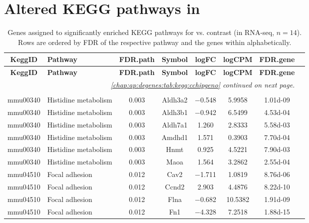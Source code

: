\section{Altered KEGG pathways in \dnmtchip}
{ \footnotesize
	\begin{longtable}[l]{cp{4.3cm}cccccc}
		\label{chap:ap:degenes:tab:kegg:cchipgeno}	
\textbf{KeggID}	& \textbf{Pathway}	& \textbf{FDR.path} & \textbf{Symbol}	 & \textbf{logFC}	& \textbf{logCPM}	& \textbf{FDR.gene}\\ 
		\hline
		\endfirsthead 
\textbf{KeggID}	& \textbf{Pathway}	& \textbf{FDR.path} & \textbf{Symbol}	& \textbf{logFC}	& \textbf{logCPM}	& \textbf{FDR.gene}\\ 
		\hline
		\endhead 
		\hline
		\multicolumn{7}{r}{\textit{	\autoref{chap:ap:degenes:tab:kegg:cchipgeno}	continued on next page.}}\\
		\endfoot
		\hline
		\multicolumn{7}{r}{\textit{}}\\
		\caption{Genes assigned to significantly enriched KEGG pathways for \dnmtchip vs. \dnmtwt contrast (in RNA-seq, $n=14$). Rows are ordered by FDR of the respective pathway and the genes within alphabetically.}
		\endlastfoot
mmu00340	& Histidine metabolism	& \num{0.003}	& Aldh3a2	& \num{-0.548}	& \num{ 5.9958}	& \num{1.01d-09}\\ 
mmu00340	& Histidine metabolism	& \num{0.003}	& Aldh3b1	& \num{-0.942}	& \num{ 6.5499}	& \num{4.53d-04}\\ 
mmu00340	& Histidine metabolism	& \num{0.003}	& Aldh7a1	& \num{ 1.260}	& \num{ 2.8333}	& \num{5.58d-03}\\ 
mmu00340	& Histidine metabolism	& \num{0.003}	& Amdhd1	& \num{ 1.571}	& \num{ 0.3903}	& \num{7.70d-04}\\ 
mmu00340	& Histidine metabolism	& \num{0.003}	& Hnmt	& \num{ 0.925}	& \num{ 4.5221}	& \num{7.90d-03}\\ 
mmu00340	& Histidine metabolism	& \num{0.003}	& Maoa	& \num{ 1.564}	& \num{ 3.2862}	& \num{2.55d-04}\\ 
mmu04510	& Focal adhesion	& \num{0.012}	& Cav2	& \num{-1.711}	& \num{ 1.0819}	& \num{8.76d-06}\\ 
mmu04510	& Focal adhesion	& \num{0.012}	& Ccnd2	& \num{ 2.903}	& \num{ 4.4876}	& \num{8.22d-10}\\ 
mmu04510	& Focal adhesion	& \num{0.012}	& Flna	& \num{-0.682}	& \num{10.5382}	& \num{1.91d-09}\\ 
mmu04510	& Focal adhesion	& \num{0.012}	& Fn1	& \num{-4.328}	& \num{ 7.2518}	& \num{1.88d-15}\\ 

\end{longtable}}

